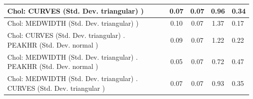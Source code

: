 \begin{table}
\begin{center}
\begin{tabular}{|l|l|c|c|c|l|}
			\hline
			 Chol: CURVES (Std. Dev. triangular) ) &  & 0.07 & 0.07 & 0.96 & 0.34 \\
			\hline
			 Chol: MEDWIDTH (Std. Dev. triangular) ) &  & 0.10 & 0.07 & 1.37 & 0.17 \\
			\hline
			 Chol: CURVES (Std. Dev. triangular) . PEAKHR (Std. Dev.   normal ) &  & 0.09 & 0.07 & 1.22 & 0.22 \\
			\hline
			 Chol: MEDWIDTH (Std. Dev. triangular) . PEAKHR (Std. Dev.   normal ) &  & 0.05 & 0.07 & 0.72 & 0.47 \\
			\hline
			 Chol: MEDWIDTH (Std. Dev. triangular) . CURVES (Std. Dev.   triangular ) &  & 0.07 & 0.07 & 0.93 & 0.35 \\
			\hline
		\end{tabular}
	\end{center}
\end{table}